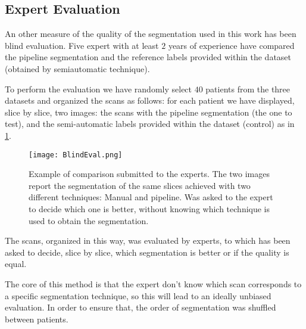 \documentclass{standalone}
\begin{document}
	\subsection{Expert Evaluation}
	
	An other measure of the quality of the segmentation used in this work has been blind evaluation. Five expert with at least $2$ years of experience have compared the pipeline segmentation and the reference labels provided within the dataset (obtained by semiautomatic technique). 
	
	To perform the evaluation  we have randomly select $40$ patients from the three datasets and organized the scans as follows:
	for each patient we have displayed, slice by slice,  two images: the scans with the pipeline segmentation (the one to test), and the semi-automatic labels provided within the dataset (control) as in \figurename\,\ref{fig:Blind}.
	
	\begin{figure}[h!]
		\centering
			\texttt{[image: BlindEval.png]}
			\caption{Example of comparison submitted to the experts. The two images report the segmentation of the same slices achieved with two different techniques: Manual and pipeline. Was asked to the expert to decide which one is better, without knowing which technique is used to obtain the segmentation.}\label{fig:Blind}
	\end{figure}

	The scans, organized in this way, was evaluated by experts, to which has been asked to decide, slice by slice, which segmentation is better or if the quality is equal.
	
	The core of this method is that the expert don't know which scan corresponds to a specific segmentation technique, so this will lead to an ideally unbiased evaluation.  In order to ensure that, the order of segmentation was shuffled between patients. 
	
	

	
\end{document}
